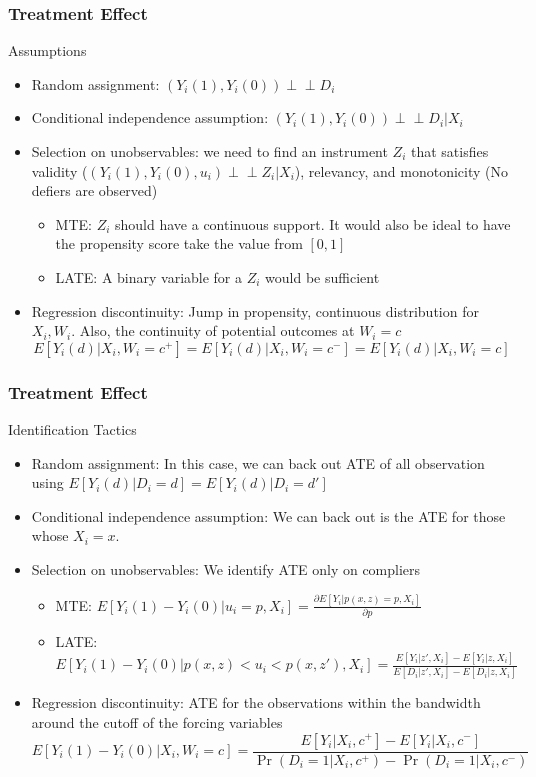 \documentclass{beamer}
\begin{document}
\begin{frame}
\frametitle{Treatment Effect}
Assumptions 
\begin{itemize}
\item Random assignment: $(Y_i(1), Y_i(0)) \perp\!\!\!\perp D_i$
\item Conditional independence assumption: $(Y_i(1), Y_i(0)) \perp\!\!\!\perp D_i|X_i$
\item Selection on unobservables: we need to find an instrument $Z_i$ that satisfies validity ($(Y_i(1), Y_i(0), u_i) \perp\!\!\! \perp Z_i|X_i$), relevancy, and monotonicity (No defiers are observed)
\begin{itemize}
\item MTE:  $Z_i$ should have a continuous support. It would also be ideal to have the propensity score take the value from $[0,1]$
\item LATE:  A binary variable for a $Z_i$ would be sufficient
\end{itemize}
\item Regression discontinuity: Jump in propensity, continuous distribution for $X_i, W_i$. Also, the continuity of potential outcomes at $W_i=c$ 
\[
E[Y_i(d)|X_i, W_i=c^+]=E[Y_i(d)|X_i, W_i=c^-]=E[Y_i(d)|X_i, W_i=c]
\]
\end{itemize}
\end{frame}

\begin{frame}
\frametitle{Treatment Effect}
Identification Tactics
\begin{itemize}
\item Random assignment:  In this case, we can back out ATE of all observation using  $E[Y_i(d)|D_i=d]=E[Y_i(d)|D_i=d']$
\item Conditional independence assumption: We can back out is the ATE for those whose $X_i=x$.
\item Selection on unobservables: We identify ATE only on compliers
\begin{itemize}
\item MTE: $E[Y_i(1)-Y_i(0)|u_i=p, X_i]=\frac{\partial E[Y_i|p(x,z)=p, X_i]}{\partial p}$
\item LATE: \footnotesize{$E[Y_i(1)-Y_i(0)|p(x,z)<u_i<p(x,z'),X_i]=\frac{E[Y_i|z',X_i]-E[Y_i|z,X_i]}{E[D_i|z',X_i]-E[D_i|z,X_i]}$}\normalsize
\end{itemize}
\item Regression discontinuity: ATE for the observations within the bandwidth around the cutoff of the forcing variables
\[
E[Y_i(1)-Y_i(0)|X_i,W_i=c]=\frac{E[Y_i|X_i, c^+]-E[Y_i|X_i, c^-]}{\Pr(D_i=1|X_i, c^+)-\Pr(D_i=1|X_i, c^-)}
\]
\end{itemize}
\end{frame}
\end{document}
